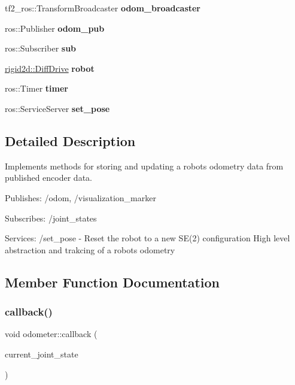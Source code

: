 \begin{DoxyCompactItemize}
\item 
\mbox{\label{classodometer_ac8cb1419d75e761754625b8545f58db8}} 
tf2\+\_\+ros\+::\+Transform\+Broadcaster {\bfseries odom\+\_\+broadcaster}
\item 
\mbox{\label{classodometer_a1fbe3a51851f04f7e23d08ae9effce6e}} 
ros\+::\+Publisher {\bfseries odom\+\_\+pub}
\item 
\mbox{\label{classodometer_aaf5de7e9f79d6eec30f89e8fdf72768a}} 
ros\+::\+Subscriber {\bfseries sub}
\item 
\mbox{\label{classodometer_abf9b513857c6af2fc2cbe26e17e3295a}} 
\hyperlink{classrigid2d_1_1DiffDrive}{rigid2d\+::\+Diff\+Drive} {\bfseries robot}
\item 
\mbox{\label{classodometer_ad3e50ca62482e4768a49487b2c7938b8}} 
ros\+::\+Timer {\bfseries timer}
\item 
\mbox{\label{classodometer_a40093da249f61b22cf5fd3600135412e}} 
ros\+::\+Service\+Server {\bfseries set\+\_\+pose}
\end{DoxyCompactItemize}


\subsection{Detailed Description}
Implements methods for storing and updating a robot\textquotesingle{}s odometry data from published encoder data. 

Publishes\+: /odom, /visualization\+\_\+marker

Subscribes\+: /joint\+\_\+states

Services\+: /set\+\_\+pose -\/ Reset the robot to a new S\+E(2) configuration High level abstraction and trakcing of a robot\textquotesingle{}s odometry 

\subsection{Member Function Documentation}
\mbox{\label{classodometer_a239d6c3386d056bd69978ae3021c4a55}} 
\subsubsection{\texorpdfstring{callback()}{callback()}}
{\footnotesize\ttfamily void odometer\+::callback (\begin{DoxyParamCaption}\item[{sensor\+\_\+msgs\+::\+Joint\+State}]{current\+\_\+joint\+\_\+state }\end{DoxyParamCaption})\hspace{0.3cm}{\ttfamily [inline]}}



